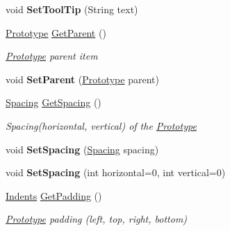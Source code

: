 \begin{DoxyCompactItemize}
void {\bfseries Set\+Tool\+Tip} (String text)
\item 
\mbox{\hyperlink{class_space_v_i_l_1_1_prototype}{Prototype}} \mbox{\hyperlink{class_space_v_i_l_1_1_prototype_a52d0e3c6f4e673553cd78fad20bded6b}{Get\+Parent}} ()
\begin{DoxyCompactList}\small\item\em \mbox{\hyperlink{class_space_v_i_l_1_1_prototype}{Prototype}} parent item \end{DoxyCompactList}\item 
\mbox{\label{class_space_v_i_l_1_1_prototype_a3814d1b4d892698231abf8db38e3c0c7}} 
void {\bfseries Set\+Parent} (\mbox{\hyperlink{class_space_v_i_l_1_1_prototype}{Prototype}} parent)
\item 
\mbox{\hyperlink{struct_space_v_i_l_1_1_decorations_1_1_spacing}{Spacing}} \mbox{\hyperlink{class_space_v_i_l_1_1_prototype_a615a4bdc121cb4a4e93d3c25ecb2bb35}{Get\+Spacing}} ()
\begin{DoxyCompactList}\small\item\em Spacing(horizontal, vertical) of the \mbox{\hyperlink{class_space_v_i_l_1_1_prototype}{Prototype}} \end{DoxyCompactList}\item 
\mbox{\label{class_space_v_i_l_1_1_prototype_a857f1c5c7d85c1a4ded748af4228099f}} 
void {\bfseries Set\+Spacing} (\mbox{\hyperlink{struct_space_v_i_l_1_1_decorations_1_1_spacing}{Spacing}} spacing)
\item 
\mbox{\label{class_space_v_i_l_1_1_prototype_ad6ef3f9120ecc69438d1e43950648ce5}} 
void {\bfseries Set\+Spacing} (int horizontal=0, int vertical=0)
\item 
\mbox{\hyperlink{struct_space_v_i_l_1_1_decorations_1_1_indents}{Indents}} \mbox{\hyperlink{class_space_v_i_l_1_1_prototype_a861ce67e320359dc1bf36a68b2a039b4}{Get\+Padding}} ()
\begin{DoxyCompactList}\small\item\em \mbox{\hyperlink{class_space_v_i_l_1_1_prototype}{Prototype}} padding (left, top, right, bottom) \end{DoxyCompactList}\item 
\mbox{\label{class_space_v_i_l_1_1_prototype_a0fd3389bccf866272a9e655c70a04a8a}} 

\end{DoxyCompactItemize}
